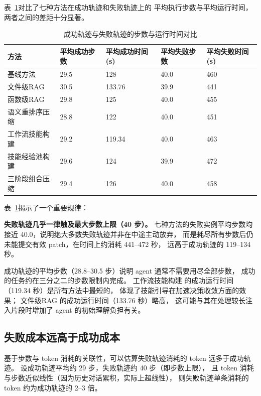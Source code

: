 表~\ref{tab:success-fail-stats}对比了七种方法在成功轨迹和失败轨迹上的
平均执行步数与平均运行时间，两者之间的差距十分显著。

\begin{table}[htbp]
  \centering
  \caption{成功轨迹与失败轨迹的步数与运行时间对比}
  \label{tab:success-fail-stats}
  \setlength{\tabcolsep}{5pt}
  \begin{tabularx}{\textwidth}{lXXXX}
    \toprule
    方法 & 平均成功步数 & 平均成功时间(s) & 平均失败步数 & 平均失败时间(s) \\
    \midrule
    基线方法       & 29.5 & 128 & 40.0 & 460 \\
    文件级RAG           & 30.5 & 133.76       & 39.9 & 441 \\
    函数级RAG       & 29.8 & 125 & 40.0 & 455 \\
    语义重排序压缩 & 28.8 & 122 & 40.0 & 451 \\
    工作流技能构建  & 29.2 & 119.34       & 40.0 & 463 \\
    技能经验池构建   & 29.6 & 124 & 39.9 & 472 \\
    三阶段组合压缩   & 29.4 & 126 & 40.0 & 458 \\
    \bottomrule
  \end{tabularx}
\end{table}

表~\ref{tab:success-fail-stats}揭示了一个重要规律：

\textbf{失败轨迹几乎一律触及最大步数上限（40 步）。}
七种方法的失败实例平均步数均接近 40.0，说明绝大多数失败轨迹并非在中途主动放弃，
而是耗尽所有步数后仍未能提交有效 patch，在时间上约消耗 441–472 秒，
远高于成功轨迹的 119–134 秒。

成功轨迹的平均步数（28.8–30.5 步）说明 agent 通常不需要用尽全部步数，
成功的任务约在三分之二的步数限制内完成。
工作流技能构建 的成功运行时间（119.34 秒）是所有方法中最短的，
体现了技能引导在加速决策收敛方面的效果；
文件级RAG 的成功运行时间（133.76 秒）略高，
这可能与其在处理较长注入片段时增加了 agent 的初始理解负担有关。

\subsection{失败成本远高于成功成本}
\label{subsec:failure-cost-dominates}

基于步数与 token 消耗的关联性，可以估算失败轨迹消耗的 token 远多于成功轨迹。
设成功轨迹平均约 29 步，失败轨迹约 40 步（即步数上限），
且 token 消耗与步数近似线性（因为历史对话累积，实际上超线性），
则失败轨迹单条消耗的 token 约为成功轨迹的 2–3 倍。

